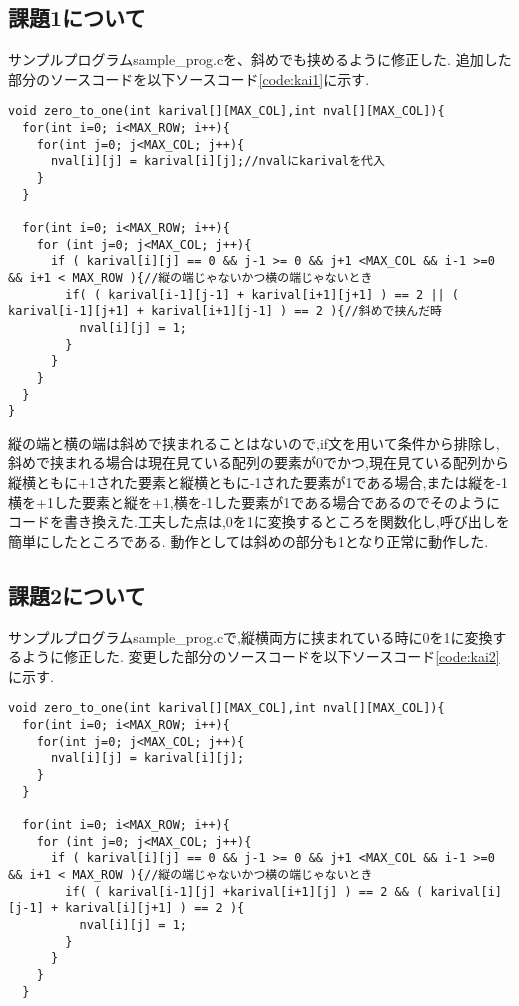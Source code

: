 \documentclass{jarticle}
\begin{document}
\subsection{課題1について}
\label{subsec:kadai1}
サンプルプログラムsample\_prog.cを、斜めでも挟めるように修正した.
追加した部分のソースコードを以下ソースコード\ref{code:kai1}に示す.
\begin{lstlisting}[caption = 課題1,label=code:kai1]
void zero_to_one(int karival[][MAX_COL],int nval[][MAX_COL]){
  for(int i=0; i<MAX_ROW; i++){
    for(int j=0; j<MAX_COL; j++){
      nval[i][j] = karival[i][j];//nvalにkarivalを代入
    }
  }

  for(int i=0; i<MAX_ROW; i++){
    for (int j=0; j<MAX_COL; j++){
      if ( karival[i][j] == 0 && j-1 >= 0 && j+1 <MAX_COL && i-1 >=0 && i+1 < MAX_ROW ){//縦の端じゃないかつ横の端じゃないとき
        if( ( karival[i-1][j-1] + karival[i+1][j+1] ) == 2 || ( karival[i-1][j+1] + karival[i+1][j-1] ) == 2 ){//斜めで挟んだ時 
          nval[i][j] = 1;
        }
      }
    }
  }
}
\end{lstlisting}

縦の端と横の端は斜めで挟まれることはないので,if文を用いて条件から排除し,斜めで挟まれる場合は現在見ている配列の要素が0でかつ,現在見ている配列から縦横ともに+1された要素と縦横ともに-1された要素が1である場合,または縦を-1横を+1した要素と縦を+1,横を-1した要素が1である場合であるのでそのようにコードを書き換えた.工夫した点は,0を1に変換するところを関数化し,呼び出しを簡単にしたところである.
動作としては斜めの部分も1となり正常に動作した.
\subsection{課題2について}
\label{subsec:kadai2}
サンプルプログラムsample\_prog.cで,縦横両方に挟まれている時に0を1に変換するように修正した.
変更した部分のソースコードを以下ソースコード\ref{code:kai2}に示す.
\begin{lstlisting}[caption = 課題2,label=code:kai2]
void zero_to_one(int karival[][MAX_COL],int nval[][MAX_COL]){
  for(int i=0; i<MAX_ROW; i++){
    for(int j=0; j<MAX_COL; j++){
      nval[i][j] = karival[i][j];
    }
  }

  for(int i=0; i<MAX_ROW; i++){
    for (int j=0; j<MAX_COL; j++){
      if ( karival[i][j] == 0 && j-1 >= 0 && j+1 <MAX_COL && i-1 >=0 && i+1 < MAX_ROW ){//縦の端じゃないかつ横の端じゃないとき
        if( ( karival[i-1][j] +karival[i+1][j] ) == 2 && ( karival[i][j-1] + karival[i][j+1] ) == 2 ){ 
          nval[i][j] = 1;
        }
      }
    }
  }
\end{lstlisting}
\end{document}
